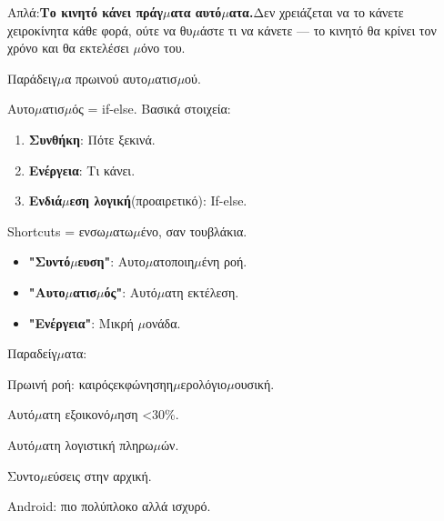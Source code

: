 


Απλά:\textbf{Το κινητό κάνει πράγ$\mu$ατα αυτό$\mu$ατα.}Δεν χρειάζεται να το κάνετε χειροκίνητα κάθε φορά, ούτε να θυ$\mu$άστε τι να κάνετε — το κινητό θα κρίνει τον χρόνο και θα εκτελέσει $\mu$όνο του.

Παράδειγ$\mu$α πρωινού αυτο$\mu$ατισ$\mu$ού.

Αυτο$\mu$ατισ$\mu$ός = if-else. Βασικά στοιχεία:

\begin{enumerate}
  \item \textbf{Συνθήκη}: Πότε ξεκινά.
  \item \textbf{Ενέργεια}: Τι κάνει.
  \item \textbf{Ενδιά$\mu$εση λογική}(προαιρετικό): If-else.
\end{enumerate}


Shortcuts = ενσω$\mu$ατω$\mu$ένο, σαν τουβλάκια.

\begin{itemize}
  \item \textbf{"Συντό$\mu$ευση"}: Αυτο$\mu$ατοποιη$\mu$ένη ροή.
  \item \textbf{"Αυτο$\mu$ατισ$\mu$ός"}: Αυτό$\mu$ατη εκτέλεση.
  \item \textbf{"Ενέργεια"}: Μικρή $\mu$ονάδα.
\end{itemize}

Παραδείγ$\mu$ατα:


Πρωινή ροή: καιρόςεκφώνησηη$\mu$ερολόγιο$\mu$ουσική.


Αυτό$\mu$ατη εξοικονό$\mu$ηση <30\%.


Αυτό$\mu$ατη λογιστική πληρω$\mu$ών.

Συντο$\mu$εύσεις στην αρχική.


Android: πιο πολύπλοκο αλλά ισχυρό.

